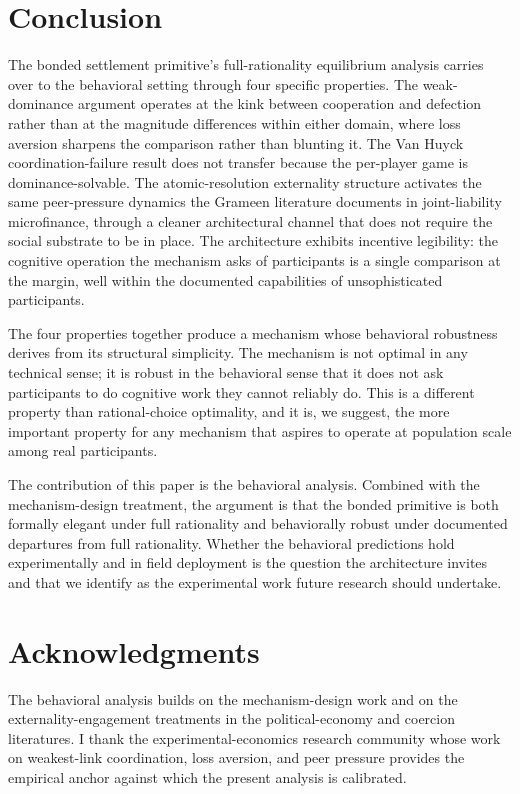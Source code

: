 \documentclass[11pt,a4paper]{article}
\theoremstyle{definition}
\theoremstyle{remark}
\begin{document}
\section{Conclusion}
\label{sec:conclusion}

The bonded settlement primitive's full-rationality equilibrium
analysis carries over to the behavioral setting through four
specific properties. The weak-dominance argument operates at the
kink between cooperation and defection rather than at the
magnitude differences within either domain, where loss aversion
sharpens the comparison rather than blunting it. The Van Huyck
coordination-failure result does not transfer because the
per-player game is dominance-solvable. The atomic-resolution
externality structure activates the same peer-pressure dynamics
the Grameen literature documents in joint-liability microfinance,
through a cleaner architectural channel that does not require the
social substrate to be in place. The architecture exhibits
incentive legibility: the cognitive operation the mechanism asks
of participants is a single comparison at the margin, well within
the documented capabilities of unsophisticated participants.

The four properties together produce a mechanism whose behavioral
robustness derives from its structural simplicity. The mechanism
is not optimal in any technical sense; it is robust in the
behavioral sense that it does not ask participants to do
cognitive work they cannot reliably do. This is a different
property than rational-choice optimality, and it is, we suggest,
the more important property for any mechanism that aspires to
operate at population scale among real participants.

The contribution of this paper is the behavioral analysis.
Combined with the mechanism-design treatment, the argument is
that the bonded primitive is both formally elegant under full
rationality and behaviorally robust
under documented departures from full rationality. Whether the
behavioral predictions hold experimentally and in field deployment
is the question the architecture invites and that we identify as
the experimental work future research should undertake.

\section*{Acknowledgments}
The behavioral analysis builds on the mechanism-design work and
on the externality-engagement treatments in the political-economy
and coercion literatures.
I thank the experimental-economics research community whose work
on weakest-link coordination, loss aversion, and peer pressure
provides the empirical anchor against which the present analysis
is calibrated.
\end{document}
